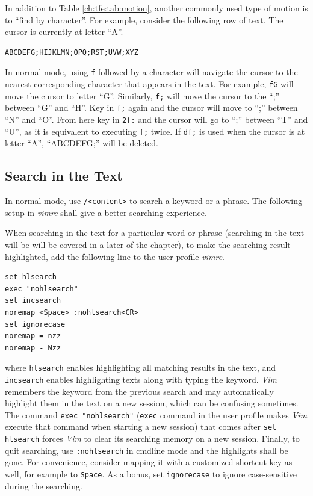 In addition to Table \ref{ch:tfe:tab:motion}, another commonly used type of motion is to ``find by character''. For example, consider the following row of text. The cursor is currently at letter ``A''.
\begin{lstlisting}
ABCDEFG;HIJKLMN;OPQ;RST;UVW;XYZ
\end{lstlisting}
In normal mode, using \verb|f| followed by a character will navigate the cursor to the nearest corresponding character that appears in the text. For example, \verb|fG| will move the cursor to letter ``G''. Similarly, \verb|f;| will move the cursor to the ``;'' between ``G'' and ``H''. Key in \verb|f;| again and the cursor will move to ``;'' between ``N'' and ``O''. From here key in \verb|2f:| and the cursor will go to ``;'' between ``T'' and ``U'', as it is equivalent to executing \verb|f;| twice. If \verb|df;| is used when the cursor is at letter ``A'', ``ABCDEFG;'' will be deleted.

\subsection{Search in the Text}

In normal mode, use \verb|/<content>| to search a keyword or a phrase. The following setup in \textit{vimrc} shall give a better searching experience.

When searching in the text for a particular word or phrase (searching in the text will be will be covered in a later of the chapter), to make the searching result highlighted, add the following line to the user profile \textit{vimrc}.
\begin{lstlisting}
set hlsearch
exec "nohlsearch"
set incsearch
noremap <Space> :nohlsearch<CR>
set ignorecase
noremap = nzz
noremap - Nzz
\end{lstlisting}
where \verb|hlsearch| enables highlighting all matching results in the text, and \verb|incsearch| enables highlighting texts along with typing the keyword. \textit{Vim} remembers the keyword from the previous search and may automatically highlight them in the text on a new session, which can be confusing sometimes. The command \verb|exec "nohlsearch"| (\verb|exec| command in the user profile makes \textit{Vim} execute that command when starting a new session) that comes after \verb|set hlsearch| forces \textit{Vim} to clear its searching memory on a new session. Finally, to quit searching, use \verb|:nohlsearch| in cmdline mode and the highlights shall be gone. For convenience, consider mapping it with a customized shortcut key as well, for example to \verb|Space|. As a bonus, set \verb|ignorecase| to ignore case-sensitive during the searching.

